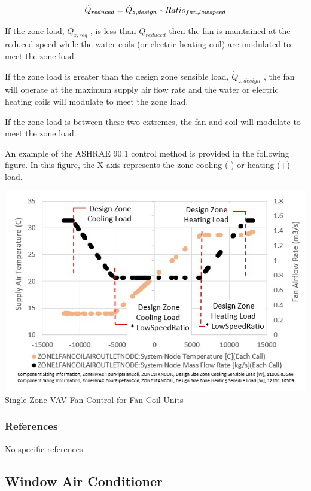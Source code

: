 \begin{equation}
{\dot Q_{reduced}} = {\dot Q_{z,design}} * {Ratio_{fan,low{\rm{ }}speed}}
\end{equation}

If the zone load, \({\dot Q_{z,req}}\) , is less than \({Q_{reduced}}\) then the fan is maintained at the reduced speed while the water coils (or electric heating coil) are modulated to meet the zone load.

If the zone load is greater than the design zone sensible load, \({\dot Q_{z,design}}\) , the fan will operate at the maximum supply air flow rate and the water or electric heating coils will modulate to meet the zone load.

If the zone load is between these two extremes, the fan and coil will modulate to meet the zone load.

An example of the ASHRAE 90.1 control method is provided in the following figure. In this figure, the X-axis represents the zone cooling (-) or heating (+) load.

\includegraphics{media/SZVAV_Fan_Control_FanCoil.jpg} Single-Zone VAV Fan Control for Fan Coil Units

\subsubsection{References}\label{references-4-003}

No specific references.

\subsection{Window Air Conditioner}\label{window-air-conditioner}

